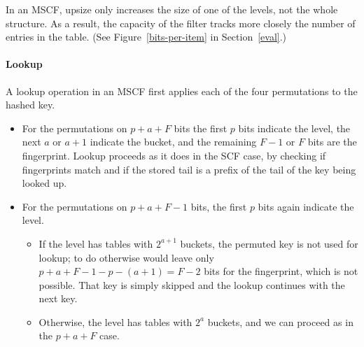 \documentclass[letterpaper,twocolumn,10pt]{article}
\newcommand{\ints}{\mathbb{Z}}
\newcommand{\TCF}{SCF}
\newcommand{\MTCF}{MSCF}
\newcommand{\TCF}{TCF}
\newcommand{\MTCF}{MTCF}
\begin{document}
In an \MTCF{}, upsize only increases the size of one of the levels, not the whole structure.
As a result, the capacity of the filter tracks more closely the number of entries in the table. (See Figure~\ref{bits-per-item} in Section~\ref{eval}.)

\paragraph{Lookup}
A lookup operation in an \MTCF{} first applies each of the four permutations to the hashed key.
\begin{itemize}
\item For the permutations on $p + a + F$ bits %
the first $p$ bits indicate the level, %
the next $a$ or $a+1$ indicate the bucket, %
and the remaining $F-1$ or $F$ bits are the fingerprint.
Lookup proceeds as it does in the \TCF{} case, by checking if fingerprints match and if the stored tail is a prefix of the tail of the key being looked up. %
\item For the permutations on $p + a + F - 1$ bits, the first $p$ bits again indicate the level. %
\begin{itemize}
\item If the level has tables with $2^{a+1}$ buckets, the permuted key is not used for lookup; to do otherwise would leave only $p + a + F - 1 - p - (a+1) = F-2$ bits for the fingerprint, which is not possible.
That key is simply skipped and the lookup continues with the next key. %
\item Otherwise, the level has tables with $2^a$ buckets, and we can proceed as in the $p+a+F$ case. %
\end{itemize}
\end{itemize}

\end{document}
